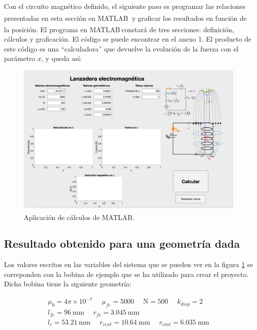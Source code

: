 Con el circuito magnético definido, el siguiente paso es programar las relaciones presentadas en esta sección en MATLAB\textsuperscript{\textregistered}\(~\) y graficar los resultados en función de la posición. El programa en MATLAB\textsuperscript{\textregistered}\(~\)constará de tres secciones: definición, cálculos y graficación. El código se puede encontrar en el anexo 1. El producto de este código es una ``calculadora'' que devuelve la evolución de la fuerza con el parámetro \(x\), y queda así:

\begin{figure}[H]
    \centering
    \includegraphics[width=\linewidth]{FigurasMemoria/calculadora.png}
    \caption{Aplicación de cálculos de MATLAB\textsuperscript{\textregistered}.}
    \label{fig:calculadora} %
\end{figure}

\newpage

\subsection{Resultado obtenido para una geometría dada}

Los valores escritos en las variables del sistema que se pueden ver en la figura \ref{fig:calculadora} se correponden con la bobina de ejemplo que se ha utilizado para crear el proyecto. Dicha bobina tiene la siguiente geometría:

\[
\begin{array}{c}
    \mu_0 = 4\pi \times 10^{-7}~~~~~~\mu_{fe} = 5000~~~~~~\text{N} = 500~~~~~~k_{disp} = 2 \\
    l_{fe} = 96~\text{mm}~~~~~~r_{fe} = 3.045~\text{mm} \\
    l_c = 53.21~\text{mm}~~~~~~r_{cext} = 10.64~\text{mm}~~~~~~r_{cint}=6.035~\text{mm} 
\end{array}
\]

